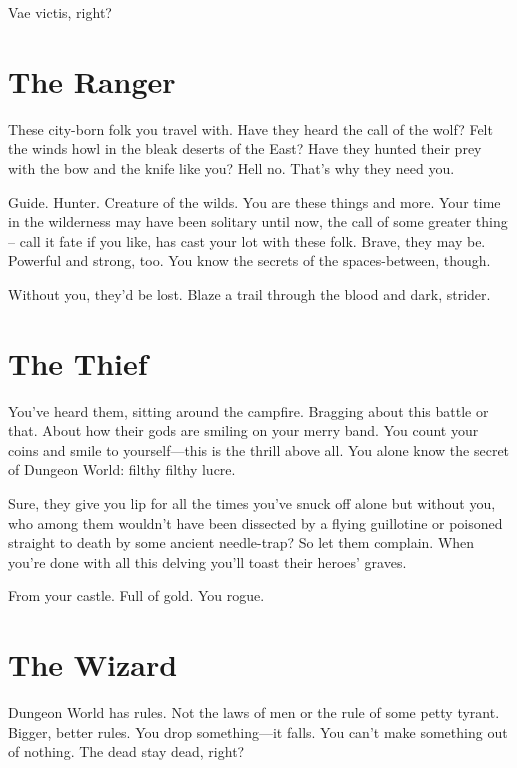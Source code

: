  

Vae victis, right?

 
\section{The Ranger}   
 

These city-born folk you travel with. Have they heard the call of the wolf? Felt the winds howl in the bleak deserts of the East? Have they hunted their prey with the bow and the knife like you? Hell no. That’s why they need you.

 

Guide. Hunter. Creature of the wilds. You are these things and more. Your time in the wilderness may have been solitary until now, the call of some greater thing – call it fate if you like, has cast your lot with these folk. Brave, they may be. Powerful and strong, too. You know the secrets of the spaces-between, though.

 

Without you, they’d be lost. Blaze a trail through the blood and dark, strider.

 
\section{The Thief}   
 

You’ve heard them, sitting around the campfire. Bragging about this battle or that. About how their gods are smiling on your merry band. You count your coins and smile to yourself—this is the thrill above all. You alone know the secret of Dungeon World: filthy filthy lucre.

  

Sure, they give you lip for all the times you’ve snuck off alone but without you, who among them wouldn’t have been dissected by a flying guillotine or poisoned straight to death by some ancient needle-trap? So let them complain. When you’re done with all this delving you’ll toast their heroes' graves.

 

From your castle. Full of gold. You rogue.

 
\section{The Wizard}   
 

Dungeon World has rules. Not the laws of men or the rule of some petty tyrant. Bigger, better rules. You drop something—it falls. You can’t make something out of nothing. The dead stay dead, right?

